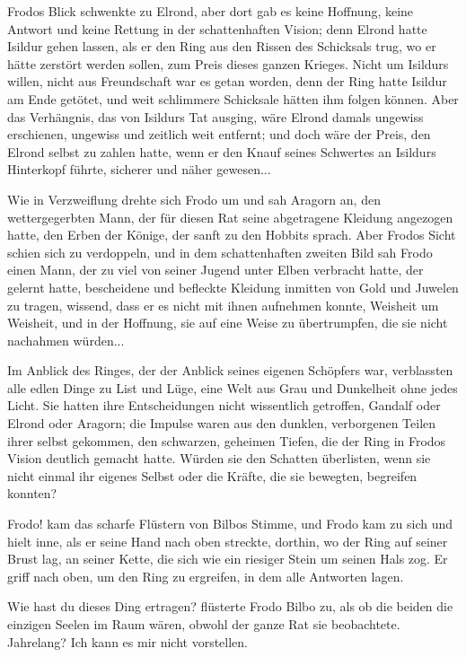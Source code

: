 Frodos Blick schwenkte zu Elrond, aber dort gab es keine Hoffnung, keine Antwort
und keine Rettung in der schattenhaften Vision; denn Elrond hatte Isildur gehen
lassen, als er den Ring aus den Rissen des Schicksals trug, wo er hätte zerstört
werden sollen, zum Preis dieses ganzen Krieges. Nicht um Isildurs willen, nicht
aus Freundschaft war es getan worden, denn der Ring hatte Isildur am Ende
getötet, und weit schlimmere Schicksale hätten ihm folgen können. Aber das
Verhängnis, das von Isildurs Tat ausging, wäre Elrond damals ungewiss
erschienen, ungewiss und zeitlich weit entfernt; und doch wäre der Preis, den
Elrond selbst zu zahlen hatte, wenn er den Knauf seines Schwertes an Isildurs
Hinterkopf führte, sicherer und näher gewesen...

Wie in Verzweiflung drehte sich Frodo um und sah Aragorn an, den wettergegerbten
Mann, der für diesen Rat seine abgetragene Kleidung angezogen hatte, den Erben
der Könige, der sanft zu den Hobbits sprach. Aber Frodos Sicht schien sich zu
verdoppeln, und in dem schattenhaften zweiten Bild sah Frodo einen Mann, der zu
viel von seiner Jugend unter Elben verbracht hatte, der gelernt hatte,
bescheidene und befleckte Kleidung inmitten von Gold und Juwelen zu tragen,
wissend, dass er es nicht mit ihnen aufnehmen konnte, Weisheit um Weisheit, und
in der Hoffnung, sie auf eine Weise zu übertrumpfen, die sie nicht nachahmen
würden...

Im Anblick des Ringes, der der Anblick seines eigenen Schöpfers war, verblassten
alle edlen Dinge zu List und Lüge, eine Welt aus Grau und Dunkelheit ohne jedes
Licht. Sie hatten ihre Entscheidungen nicht wissentlich getroffen, Gandalf oder
Elrond oder Aragorn; die Impulse waren aus den dunklen, verborgenen Teilen ihrer
selbst gekommen, den schwarzen, geheimen Tiefen, die der Ring in Frodos Vision
deutlich gemacht hatte. Würden sie den Schatten überlisten, wenn sie nicht
einmal ihr eigenes Selbst oder die Kräfte, die sie bewegten, begreifen konnten?

\glqq{}Frodo!\grqq{} kam das scharfe Flüstern von Bilbos Stimme, und Frodo kam zu
sich und hielt inne, als er seine Hand nach oben streckte, dorthin, wo der Ring
auf seiner Brust lag, an seiner Kette, die sich wie ein riesiger Stein um seinen
Hals zog. Er griff nach oben, um den Ring zu ergreifen, in dem alle Antworten
lagen.

\glqq{}Wie hast du dieses Ding ertragen?\grqq{} flüsterte Frodo Bilbo zu, als ob
die beiden die einzigen Seelen im Raum wären, obwohl der ganze Rat sie
beobachtete. \glqq{}Jahrelang? Ich kann es mir nicht vorstellen.\grqq{}

